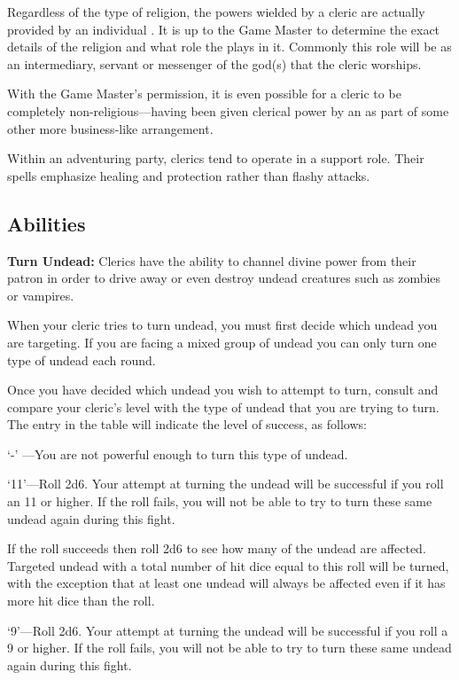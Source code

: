 \begin{multicols*}{2}
Regardless of the type of religion, the powers wielded by a cleric are actually provided by an individual . It is up to the Game Master to determine the exact details of the religion and what role the  plays in it. Commonly this role will be as an intermediary, servant or messenger of the god(s) that the cleric worships.

With the Game Master’s permission, it is even possible for a cleric to be completely non-religious—having been given clerical power by an  as part of some other more business-like arrangement.

Within an adventuring party, clerics tend to operate in a support role. Their spells emphasize healing and protection rather than flashy attacks.

\subsection{Abilities}
\textbf{Turn Undead:} Clerics have the ability to channel divine power from their patron in order to drive away or even destroy undead creatures such as zombies or vampires.

When your cleric tries to turn undead, you must first decide which undead you are targeting. If you are facing a mixed group of undead you can only turn one type of undead each round.

Once you have decided which undead you wish to attempt to turn, consult  and compare your cleric’s level with the type of undead that you are trying to turn. The entry in the table will indicate the level of success, as follows:

‘-’ —You are not powerful enough to turn this type of undead.

‘11’—Roll 2d6. Your attempt at turning the undead will be successful if you roll an 11 or higher. If the roll fails, you will not be able to try to turn these same undead again during this fight.

If the roll succeeds then roll 2d6 to see how many of the undead are affected. Targeted undead with a total number of hit dice equal to this roll will be turned, with the exception that at least one undead will always be affected even if it has more hit dice than the roll.

‘9’—Roll 2d6. Your attempt at turning the undead will be successful if you roll a 9 or higher. If the roll fails, you will not be able to try to turn these same undead again during this fight.


\end{multicols*}
